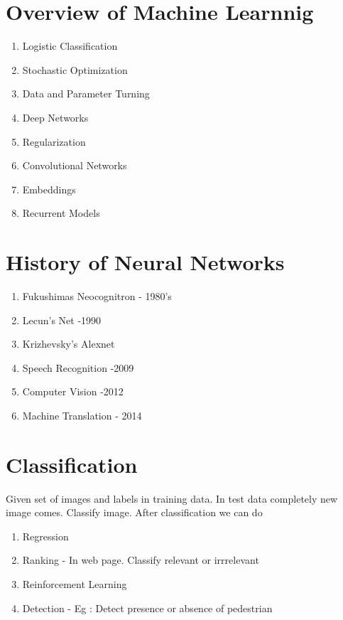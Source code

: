 \documentclass[a4paper,10pt]{article}
\title{}
\author{}
\begin{document}
\maketitle

\begin{abstract}

\end{abstract}

\section{Overview of Machine Learnnig}
\begin{enumerate}
 \item Logistic Classification
 \item Stochastic Optimization
 \item Data and Parameter Turning
 \item Deep Networks
 \item Regularization
 \item Convolutional Networks
 \item Embeddings
 \item Recurrent Models
 
\end{enumerate}


\section{History of Neural Networks}
\begin{enumerate}
 \item Fukushimas Neocognitron - 1980's
 \item Lecun's Net -1990
 \item Krizhevsky's Alexnet
 \item Speech Recognition -2009
 \item Computer Vision -2012
 \item Machine Translation - 2014
 
\end{enumerate}

\section{Classification}

Given set of images and labels in training data. In test data completely new image comes. Classify image. After classification we can do 
\begin{enumerate}
 \item Regression
 \item Ranking - In web page. Classify relevant or irrrelevant
 \item Reinforcement Learning
 \item Detection  - Eg : Detect presence or absence of pedestrian
\end{enumerate}
\end{document}
